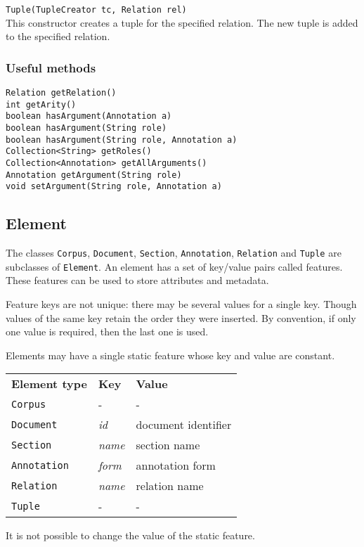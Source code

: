 \documentclass[a4paper]{article}
\begin{document}
\texttt{Tuple(TupleCreator tc, Relation rel)}\\
This constructor creates a tuple for the specified relation.
The new tuple is added to the specified relation.

\subsubsection{Useful methods}

\texttt{Relation getRelation()}\\
\texttt{int getArity()}\\
\texttt{boolean hasArgument(Annotation a)}\\
\texttt{boolean hasArgument(String role)}\\
\texttt{boolean hasArgument(String role, Annotation a)}\\
\texttt{Collection<String> getRoles()}\\
\texttt{Collection<Annotation> getAllArguments()}\\
\texttt{Annotation getArgument(String role)}\\
\texttt{void setArgument(String role, Annotation a)}\\

\subsection{Element}
The classes \texttt{Corpus}, \texttt{Document}, \texttt{Section}, \texttt{Annotation}, \texttt{Relation} and \texttt{Tuple} are subclasses of \texttt{Element}.
An element has a set of key/value pairs called features.
These features can be used to store attributes and metadata.

Feature keys are not unique: there may be several values for a single key.
Though values of the same key retain the order they were inserted.
By convention, if only one value is required, then the last one is used.

Elements may have a single static feature whose key and value are constant.

\begin{tabular}[hptb]{lll}
  \textbf{Element type} & \textbf{Key} & \textbf{Value}\\
  \texttt{Corpus} & - & -\\
  \texttt{Document} & \emph{id} & document identifier\\
  \texttt{Section} & \emph{name} & section name\\
  \texttt{Annotation} & \emph{form} & annotation form\\
  \texttt{Relation} & \emph{name} & relation name\\
  \texttt{Tuple} & - & -\\
\end{tabular}
It is not possible to change the value of the static feature.
\end{document}
